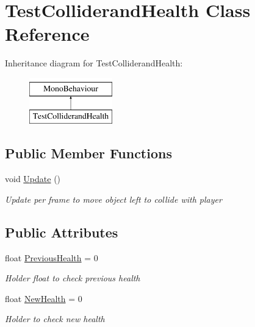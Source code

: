 \hypertarget{classTestColliderandHealth}{\section{Test\-Colliderand\-Health Class Reference}
\label{classTestColliderandHealth}
}
Inheritance diagram for Test\-Colliderand\-Health\-:\begin{figure}[H]
\begin{center}
\leavevmode
\includegraphics[height=2.000000cm]{classTestColliderandHealth}
\end{center}
\end{figure}
\subsection*{Public Member Functions}
\begin{DoxyCompactItemize}
\item 
void \hyperlink{classTestColliderandHealth_acbf64a959cd451b47dcc7907999f8b50}{Update} ()
\begin{DoxyCompactList}\small\item\em Update per frame to move object left to collide with player \end{DoxyCompactList}\end{DoxyCompactItemize}
\subsection*{Public Attributes}
\begin{DoxyCompactItemize}
\item 
float \hyperlink{classTestColliderandHealth_a4de3c72b663ad686bb26ebfde82b5889}{Previous\-Health} = 0
\begin{DoxyCompactList}\small\item\em Holder float to check previous health \end{DoxyCompactList}\item 
float \hyperlink{classTestColliderandHealth_add667d40823d533cf1d256ef3b380fe8}{New\-Health} = 0
\begin{DoxyCompactList}\small\item\em Holder to check new health \end{DoxyCompactList}\end{DoxyCompactItemize}


